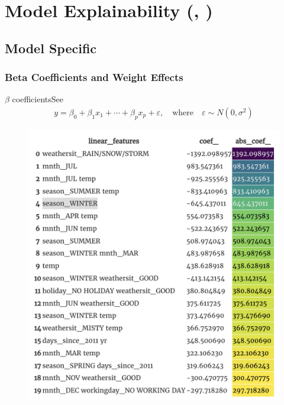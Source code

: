 \documentclass[10pt]{beamer}
\begin{document}
\section{Model Explainability (\cite{molnar2019}, \cite{masis2021})}

\subsection{Model Specific} 

\subsubsection{Beta Coefficients and Weight Effects}

\begin{frame}{$\beta$ coefficients}{See \cite[Section 5.1]{molnar2019}}
\begin{align*}
y = \beta_{0} + \beta_{1}x_{1} + \cdots + \beta_{p}x_{p} + \varepsilon, \quad \text{where} \quad \varepsilon \sim N(0, \sigma^2)
\end{align*}
\begin{center}
  \begin{figure}
    \includegraphics[scale=0.25]{images/lm_beta_table.png} 
  \end{figure}
\end{center}
\end{frame}
\end{document}
